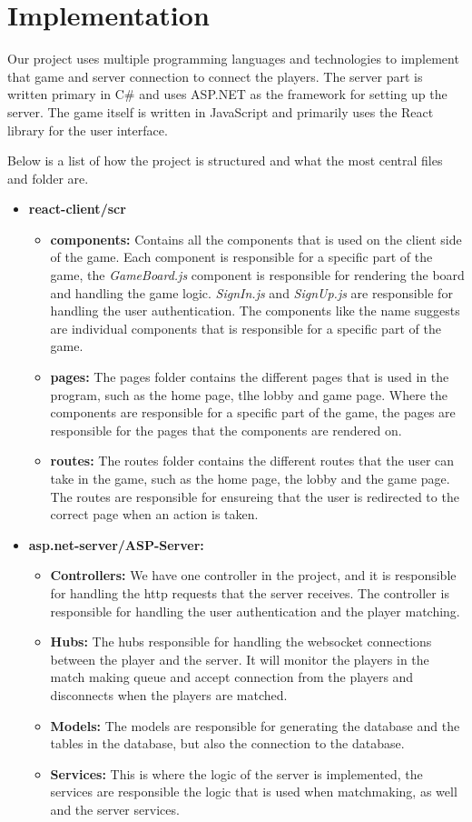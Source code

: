 \documentclass[ twoside,openright,titlepage,numbers=noenddot,headinclude,%
                footinclude=true,cleardoublepage=empty,abstractoff, %
                BCOR=5mm,paper=a4,fontsize=11pt,%
                ngerman,american,%
                ]{scrreprt}
\begin{document}
\section{Implementation}
Our project uses multiple programming languages and technologies to implement that game and server connection to connect the players. The server part is written primary in C\# and uses ASP.NET as the framework for setting up the server. The game itself is written in JavaScript and primarily uses the React library for the user interface.

Below is a list of how the project is structured and what the most central files and folder are.
\begin{itemize}
  \item \textbf{react-client/scr}
  \begin{itemize}
    \item \textbf{components:} Contains all the components that is used on the client side of the game. Each component is responsible for a specific part of the game, the \textit{GameBoard.js} component is responsible for rendering the board and handling the game logic. \textit{SignIn.js} and \textit{SignUp.js} are responsible for handling the user authentication. The components like the name suggests are individual components that is responsible for a specific part of the game. 
    \item \textbf{pages:} The pages folder contains the different pages that is used in the program, such as the home page, tlhe lobby and game page. Where the components are responsible for a specific part of the game, the pages are responsible for the pages that the components are rendered on.
    \item \textbf{routes:} The routes folder contains the different routes that the user can take in the game, such as the home page, the lobby and the game page. The routes are responsible for ensureing that the user is redirected to the correct page when an action is taken.
  \end{itemize}
  \item \textbf{asp.net-server/ASP-Server:}
  \begin{itemize}
    \item \textbf{Controllers:} We have one controller in the project, and it is responsible for handling the http requests that the server receives. The controller is responsible for handling the user authentication and the player matching.
    \item \textbf{Hubs:} The hubs responsible for handling the websocket connections between the player and the server. It will monitor the players in the match making queue and accept connection from the players and disconnects when the players are matched. 
    \item \textbf{Models:} The models are responsible for generating the database and the tables in the database, but also the connection to the database.   
    \item \textbf{Services:} This is where the logic of the server is implemented, the services are responsible the logic that is used when matchmaking, as well and the server services.
    \end{itemize}
\end{itemize}
\end{document}
